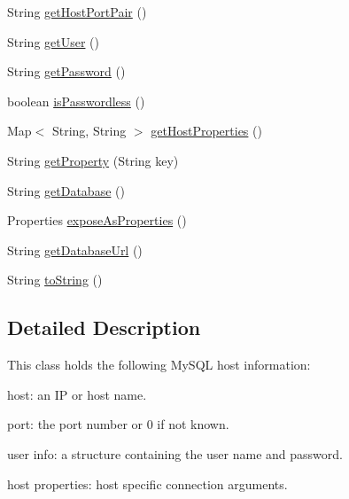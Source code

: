 \begin{DoxyCompactItemize}
\item 
String \mbox{\hyperlink{classcom_1_1mysql_1_1cj_1_1conf_1_1_host_info_a700c311c9f63a8f0031c15713ef92d6b}{get\+Host\+Port\+Pair}} ()
\item 
String \mbox{\hyperlink{classcom_1_1mysql_1_1cj_1_1conf_1_1_host_info_a5e80ba60a558bf41f970aa488f849c10}{get\+User}} ()
\item 
String \mbox{\hyperlink{classcom_1_1mysql_1_1cj_1_1conf_1_1_host_info_aebe3979385ac27249cae703ec4c5ea6c}{get\+Password}} ()
\item 
boolean \mbox{\hyperlink{classcom_1_1mysql_1_1cj_1_1conf_1_1_host_info_a6bb33f0cf17ac943b76138e3813898da}{is\+Passwordless}} ()
\item 
Map$<$ String, String $>$ \mbox{\hyperlink{classcom_1_1mysql_1_1cj_1_1conf_1_1_host_info_aac017e83698627d6cf91a8eb3b1f263b}{get\+Host\+Properties}} ()
\item 
String \mbox{\hyperlink{classcom_1_1mysql_1_1cj_1_1conf_1_1_host_info_ac8fc2bf397e189fe33af42d098220dd3}{get\+Property}} (String key)
\item 
String \mbox{\hyperlink{classcom_1_1mysql_1_1cj_1_1conf_1_1_host_info_aac3a26a2ad40c40bd6a2a8dfb4856a58}{get\+Database}} ()
\item 
Properties \mbox{\hyperlink{classcom_1_1mysql_1_1cj_1_1conf_1_1_host_info_aa316f9e75ff79e0db70ac527bbfe8cf3}{expose\+As\+Properties}} ()
\item 
String \mbox{\hyperlink{classcom_1_1mysql_1_1cj_1_1conf_1_1_host_info_a84c5d1cc48b3d5d1d9911513777f9152}{get\+Database\+Url}} ()
\item 
String \mbox{\hyperlink{classcom_1_1mysql_1_1cj_1_1conf_1_1_host_info_ac3d7e44e2787c35c23b99127865233c0}{to\+String}} ()
\end{DoxyCompactItemize}


\subsection{Detailed Description}
This class holds the following My\+S\+QL host information\+: 
\begin{DoxyItemize}
\item host\+: an IP or host name. 
\item port\+: the port number or 0 if not known. 
\item user info\+: a structure containing the user name and password. 
\item host properties\+: host specific connection arguments. 
\end{DoxyItemize}

